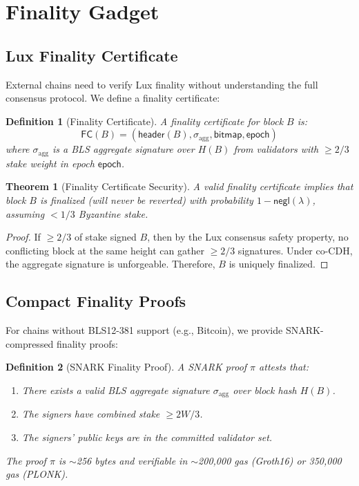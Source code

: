 \documentclass[11pt,a4paper]{article}
\newtheorem{theorem}{Theorem}
\newtheorem{definition}{Definition}
\begin{document}
\section{Finality Gadget}\label{sec:finality}

\subsection{Lux Finality Certificate}

External chains need to verify Lux finality without understanding the full consensus protocol. We define a finality certificate:

\begin{definition}[Finality Certificate]
A finality certificate for block $B$ is:
\begin{equation}
    \mathsf{FC}(B) = (\mathsf{header}(B), \sigma_{\text{agg}}, \mathsf{bitmap}, \mathsf{epoch})
\end{equation}
where $\sigma_{\text{agg}}$ is a BLS aggregate signature over $H(B)$ from validators with $\geq 2/3$ stake weight in epoch $\mathsf{epoch}$.
\end{definition}

\begin{theorem}[Finality Certificate Security]
A valid finality certificate implies that block $B$ is finalized (will never be reverted) with probability $1 - \mathsf{negl}(\lambda)$, assuming $< 1/3$ Byzantine stake.
\end{theorem}

\begin{proof}
If $\geq 2/3$ of stake signed $B$, then by the Lux consensus safety property, no conflicting block at the same height can gather $\geq 2/3$ signatures. Under co-CDH, the aggregate signature is unforgeable. Therefore, $B$ is uniquely finalized.
\end{proof}

\subsection{Compact Finality Proofs}

For chains without BLS12-381 support (e.g., Bitcoin), we provide SNARK-compressed finality proofs:

\begin{definition}[SNARK Finality Proof]
A SNARK proof $\pi$ attests that:
\begin{enumerate}
    \item There exists a valid BLS aggregate signature $\sigma_{\text{agg}}$ over block hash $H(B)$.
    \item The signers have combined stake $\geq 2W/3$.
    \item The signers' public keys are in the committed validator set.
\end{enumerate}
The proof $\pi$ is $\sim$256 bytes and verifiable in $\sim$200,000 gas (Groth16) or 350,000 gas (PLONK).
\end{definition}
\end{document}
